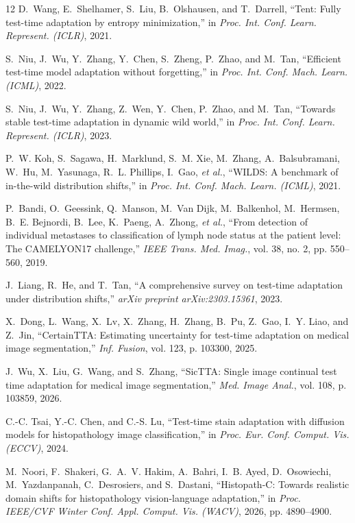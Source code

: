 \documentclass[conference]{IEEEtran}
\begin{document}
\begin{thebibliography}{12}
D.~Wang, E.~Shelhamer, S.~Liu, B.~Olshausen, and T.~Darrell, ``Tent: Fully test-time adaptation by entropy minimization,'' in \textit{Proc. Int. Conf. Learn. Represent. (ICLR)}, 2021.

S.~Niu, J.~Wu, Y.~Zhang, Y.~Chen, S.~Zheng, P.~Zhao, and M.~Tan, ``Efficient test-time model adaptation without forgetting,'' in \textit{Proc. Int. Conf. Mach. Learn. (ICML)}, 2022.

S.~Niu, J.~Wu, Y.~Zhang, Z.~Wen, Y.~Chen, P.~Zhao, and M.~Tan, ``Towards stable test-time adaptation in dynamic wild world,'' in \textit{Proc. Int. Conf. Learn. Represent. (ICLR)}, 2023.

P.~W. Koh, S.~Sagawa, H.~Marklund, S.~M. Xie, M.~Zhang, A.~Balsubramani, W.~Hu, M.~Yasunaga, R.~L. Phillips, I.~Gao, \textit{et al.}, ``{WILDS}: A benchmark of in-the-wild distribution shifts,'' in \textit{Proc. Int. Conf. Mach. Learn. (ICML)}, 2021.

P.~Bandi, O.~Geessink, Q.~Manson, M.~Van Dijk, M.~Balkenhol, M.~Hermsen, B.~E. Bejnordi, B.~Lee, K.~Paeng, A.~Zhong, \textit{et al.}, ``From detection of individual metastases to classification of lymph node status at the patient level: The {CAMELYON17} challenge,'' \textit{IEEE Trans. Med. Imag.}, vol. 38, no. 2, pp. 550--560, 2019.

J.~Liang, R.~He, and T.~Tan, ``A comprehensive survey on test-time adaptation under distribution shifts,'' \textit{arXiv preprint arXiv:2303.15361}, 2023.

X.~Dong, L.~Wang, X.~Lv, X.~Zhang, H.~Zhang, B.~Pu, Z.~Gao, I.~Y. Liao, and Z.~Jin, ``{CertainTTA}: Estimating uncertainty for test-time adaptation on medical image segmentation,'' \textit{Inf. Fusion}, vol. 123, p. 103300, 2025.

J.~Wu, X.~Liu, G.~Wang, and S.~Zhang, ``{SicTTA}: Single image continual test time adaptation for medical image segmentation,'' \textit{Med. Image Anal.}, vol. 108, p. 103859, 2026.

C.-C. Tsai, Y.-C. Chen, and C.-S. Lu, ``Test-time stain adaptation with diffusion models for histopathology image classification,'' in \textit{Proc. Eur. Conf. Comput. Vis. (ECCV)}, 2024.

M.~Noori, F.~Shakeri, G.~A.~V. Hakim, A.~Bahri, I.~B. Ayed, D.~Osowiechi, M.~Yazdanpanah, C.~Desrosiers, and S.~Dastani, ``{Histopath-C}: Towards realistic domain shifts for histopathology vision-language adaptation,'' in \textit{Proc. IEEE/CVF Winter Conf. Appl. Comput. Vis. (WACV)}, 2026, pp. 4890--4900.


\end{thebibliography}
\end{document}
